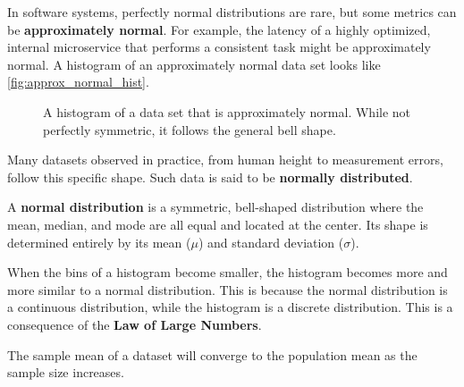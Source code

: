 In software systems, perfectly normal distributions are rare, but some metrics can be \textbf{approximately normal}. For example, the latency of a highly optimized, internal microservice that performs a consistent task might be approximately normal. A histogram of an approximately normal data set looks like \autoref{fig:approx_normal_hist}.

\begin{figure}[h!]
    \centering
    \caption{A histogram of a data set that is approximately normal. While not perfectly symmetric, it follows the general bell shape.}
    \label{fig:approx_normal_hist}
\end{figure}

Many datasets observed in practice, from human height to measurement errors, follow this specific shape. Such data is said to be \textbf{normally distributed}.

\begin{definition}
A \textbf{normal distribution} is a symmetric, bell-shaped distribution where the mean, median, and mode are all equal and located at the center. Its shape is determined entirely by its mean ($\mu$) and standard deviation ($\sigma$).
\end{definition}

When the bins of a histogram become smaller, the histogram becomes more and more similar to a normal distribution. This is because the normal distribution is a continuous distribution, while the histogram is a discrete distribution. This is a consequence of the \textbf{Law of Large Numbers}.

\begin{theorem}
    The sample mean of a dataset will converge to the population mean as the sample size increases.
\end{theorem}

